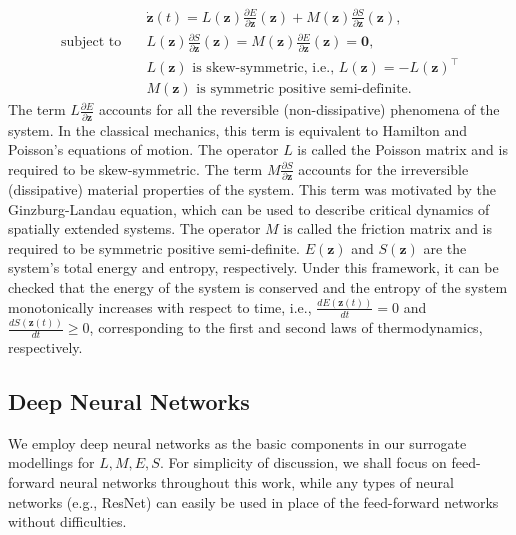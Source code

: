\documentclass[openacc]{rsproca_new}%
\newcommand{\z}{\bm{z}}
\begin{document}
\begin{equation} \label{def:GENERIC}
    \begin{split}
        &\dot{\z}(t) = L(\z)\frac{\partial E}{\partial \z}(\z) + M(\z)\frac{\partial S}{\partial \z}(\z), 
    \\
    \text{subject to} 
    \quad
    &L(\z)\frac{\partial S}{\partial \z}(\z)
    =  M(\z)\frac{\partial E}{\partial \z}(\z) = \bm{0},
    \\
    &L(\z) \text{ is skew-symmetric, i.e., } L(\z) = -L(\z)^\top \\
    &M(\z) \text{ is symmetric positive semi-definite.}
    \end{split}
\end{equation}
The term $L\frac{\partial E}{\partial \z}$ accounts for all the reversible (non-dissipative) phenomena of the system. 
In the classical mechanics, this term is equivalent to Hamilton and Poisson's equations of motion.
The operator $L$ is called the Poisson matrix 
and is required to be skew-symmetric.
The term $M\frac{\partial S}{\partial \z}$ accounts for the irreversible (dissipative) material properties of the system. This term was motivated by the Ginzburg-Landau equation, which can be used to describe critical dynamics of spatially extended systems. The operator $M$ is called the friction matrix
and is required to be symmetric positive semi-definite.
$E(\z)$ and $S(\z)$ are 
the system's total energy and entropy,
respectively. Under this framework, it can be checked that the energy of the system is conserved and the entropy of the system monotonically increases with respect to time, i.e.,
$\frac{dE(\z(t))}{dt} =0$ and $\frac{dS(\z(t))}{dt} \ge 0$,
corresponding to the first and second laws of thermodynamics, respectively.

\subsection{Deep Neural Networks}
We employ deep neural networks
as the basic components in our surrogate modellings
for $L, M, E, S$.
For simplicity of discussion, we shall focus on 
feed-forward neural networks throughout this work,
while any types of neural networks (e.g., ResNet) can easily be used in place of the feed-forward networks 
without difficulties. 
\end{document}
